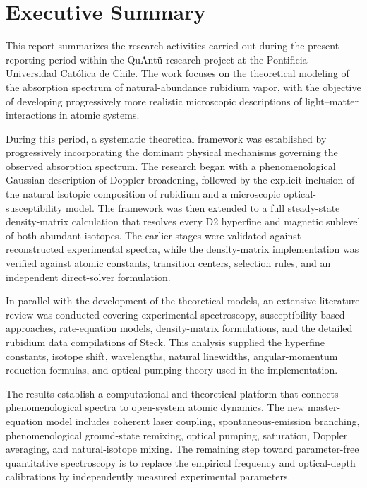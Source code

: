 \documentclass[11pt]{article}
\numberwithin{equation}{section}
\begin{document}
\section{Executive Summary}

This report summarizes the research activities carried out during the present reporting period within the QuAntü research project at the Pontificia Universidad Católica de Chile. The work focuses on the theoretical modeling of the absorption spectrum of natural-abundance rubidium vapor, with the objective of developing progressively more realistic microscopic descriptions of light--matter interactions in atomic systems.

During this period, a systematic theoretical framework was established by progressively incorporating the dominant physical mechanisms governing the observed absorption spectrum. The research began with a phenomenological Gaussian description of Doppler broadening, followed by the explicit inclusion of the natural isotopic composition of rubidium and a microscopic optical-susceptibility model. The framework was then extended to a full steady-state density-matrix calculation that resolves every D2 hyperfine and magnetic sublevel of both abundant isotopes. The earlier stages were validated against reconstructed experimental spectra, while the density-matrix implementation was verified against atomic constants, transition centers, selection rules, and an independent direct-solver formulation.

In parallel with the development of the theoretical models, an extensive literature review was conducted covering experimental spectroscopy, susceptibility-based approaches, rate-equation models, density-matrix formulations, and the detailed rubidium data compilations of Steck. This analysis supplied the hyperfine constants, isotope shift, wavelengths, natural linewidths, angular-momentum reduction formulas, and optical-pumping theory used in the implementation.

The results establish a computational and theoretical platform that connects phenomenological spectra to open-system atomic dynamics. The new master-equation model includes coherent laser coupling, spontaneous-emission branching, phenomenological ground-state remixing, optical pumping, saturation, Doppler averaging, and natural-isotope mixing. The remaining step toward parameter-free quantitative spectroscopy is to replace the empirical frequency and optical-depth calibrations by independently measured experimental parameters.
\end{document}
